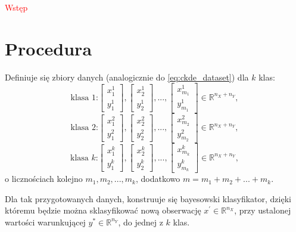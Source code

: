 \documentclass[12pt,a4paper,oneside]{book}
\theoremstyle{definition}
\begin{document}
\textcolor{red}{Wstęp}

\section{Procedura}

Definiuje się zbiory danych (analogicznie do \eqref{eq:ckde_dataset}) dla $k$ klas:
\begin{equation}\label{eq:classification_dataset1}
\text{klasa 1:}
\begin{bmatrix}
x_1^1 \\
y_1^1
\end{bmatrix},
\begin{bmatrix}
x_2^1 \\
y_2^1
\end{bmatrix},
...,
\begin{bmatrix}
x_{m_1}^1 \\
y_{m_1}^1
\end{bmatrix} \in \mathbb{R}^{n_X+n_Y},
\end{equation}
\begin{equation}\label{eq:classification_dataset2}
\text{klasa 2:}
\begin{bmatrix}
x_1^2 \\
y_1^2
\end{bmatrix},
\begin{bmatrix}
x_2^2 \\
y_2^2
\end{bmatrix},
...,
\begin{bmatrix}
x_{m_2}^2 \\
y_{m_2}^2
\end{bmatrix} \in \mathbb{R}^{n_X+n_Y},
\end{equation}
\begin{equation}\label{eq:classification_datasetk}
\text{klasa $k$:}
\begin{bmatrix}
x_1^k \\
y_1^k
\end{bmatrix},
\begin{bmatrix}
x_2^k \\
y_2^k
\end{bmatrix},
...,
\begin{bmatrix}
x_{m_k}^k \\
y_{m_k}^k
\end{bmatrix} \in \mathbb{R}^{n_X+n_Y},
\end{equation}
o licznościach kolejno $m_1, m_2, ...,m_k$, dodatkowo $m=m_1+m_2+ ...+m_k$.

Dla tak przygotowanych danych, konstruuje się bayesowski klasyfikator, dzięki któremu będzie można sklasyfikować nową obserwację $x^\prime \in \mathbb{R}^{n_X}$, przy ustalonej wartości warunkującej $y^* \in \mathbb{R}^{n_Y}$, do jednej z $k$ klas.
\end{document}
